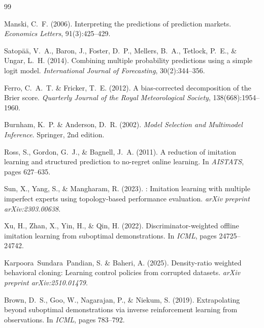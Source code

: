 \documentclass[a4paper, 11pt]{article}
\begin{document}
\begin{thebibliography}{99}

Manski, C.~F. (2006).
\newblock Interpreting the predictions of prediction markets.
\newblock \emph{Economics Letters}, 91(3):425--429.

Satop\"a\"a, V.~A., Baron, J., Foster, D.~P., Mellers, B.~A., Tetlock, P.~E., \& Ungar, L.~H. (2014).
\newblock Combining multiple probability predictions using a simple logit model.
\newblock \emph{International Journal of Forecasting}, 30(2):344--356.

Ferro, C.~A.~T. \& Fricker, T.~E. (2012).
\newblock A bias-corrected decomposition of the Brier score.
\newblock \emph{Quarterly Journal of the Royal Meteorological Society}, 138(668):1954--1960.

Burnham, K.~P. \& Anderson, D.~R. (2002).
\newblock \emph{Model Selection and Multimodel Inference}.
\newblock Springer, 2nd edition.

Ross, S., Gordon, G.~J., \& Bagnell, J.~A. (2011).
\newblock A reduction of imitation learning and structured prediction to no-regret online learning.
\newblock In \emph{AISTATS}, pages 627--635.

Sun, X., Yang, S., \& Mangharam, R. (2023).
: Imitation learning with multiple imperfect experts using topology-based performance evaluation.
\newblock \emph{arXiv preprint arXiv:2303.00638}.

Xu, H., Zhan, X., Yin, H., \& Qin, H. (2022).
\newblock Discriminator-weighted offline imitation learning from suboptimal demonstrations.
\newblock In \emph{ICML}, pages 24725--24742.

Karpoora~Sundara~Pandian, S. \& Baheri, A. (2025).
\newblock Density-ratio weighted behavioral cloning: Learning control policies from corrupted datasets.
\newblock \emph{arXiv preprint arXiv:2510.01479}.

Brown, D.~S., Goo, W., Nagarajan, P., \& Niekum, S. (2019).
\newblock Extrapolating beyond suboptimal demonstrations via inverse reinforcement learning from observations.
\newblock In \emph{ICML}, pages 783--792.


\end{thebibliography}
\end{document}
